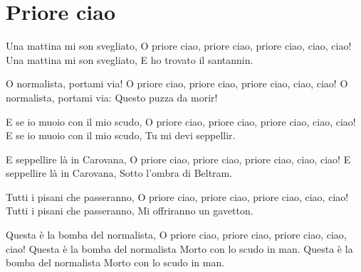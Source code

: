 \section{Priore ciao}
\subtitle{Sulla melodia di “Bella ciao“}
\begin{canzone}
Una mattina mi son svegliato,
O priore ciao, priore ciao, priore ciao, ciao, ciao!
Una mattina mi son svegliato,
E ho trovato il santannin.

O normalista, portami via!
O priore ciao, priore ciao, priore ciao, ciao, ciao!
O normalista, portami via:
Questo puzza da morir!

E se io muoio con il mio scudo,
O priore ciao, priore ciao, priore ciao, ciao, ciao!
E se io muoio con il mio scudo,
Tu mi devi seppellir.

E seppellire là in Carovana,
O priore ciao, priore ciao, priore ciao, ciao, ciao!
E seppellire là in Carovana,
Sotto l’ombra di Beltram.

Tutti i pisani che passeranno,
O priore ciao, priore ciao, priore ciao, ciao, ciao!
Tutti i pisani che passeranno,
Mi offriranno un gavetton.

Questa è la bomba del normalista,
O priore ciao, priore ciao, priore ciao, ciao, ciao!
Questa è la bomba del normalista
Morto con lo scudo in man.
Questa è la bomba del normalista
Morto con lo scudo in man.
\end{canzone}
